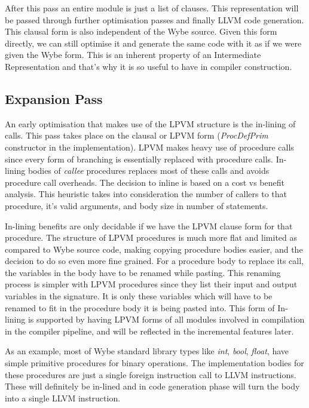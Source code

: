 After this pass an entire module is just a list of clauses. This representation
will be passed through further optimisation passes and finally LLVM code
generation. This clausal form is also independent of the Wybe source. Given
this form directly, we can still optimise it and generate the same code with it
as if we were given the Wybe form. This is an inherent property of an
Intermediate Representation and that's why it is so useful to have in compiler
construction.


\subsection{Expansion Pass}

An early optimisation that makes use of the LPVM structure is the in-lining of
calls. This pass takes place on the clausal or LPVM form (\textit{ProcDefPrim}
constructor in the implementation). LPVM makes heavy use of procedure calls
since every form of branching is essentially replaced with procedure
calls. In-lining bodies of \textit{callee} procedures replaces most of these
calls and avoids procedure call overheads. The decision to inline is based on a
cost vs benefit analysis. This heuristic takes into consideration the number of
callers to that procedure, it's valid arguments, and body size in number of
statements.

In-lining benefits are only decidable if we have the LPVM clause form for that
procedure. The structure of LPVM procedures is much more flat and limited as
compared to Wybe source code, making copying procedure bodies easier, and the
decision to do so even more fine grained. For a procedure body to replace its
call, the variables in the body have to be renamed while pasting. This renaming
process is simpler with LPVM procedures since they list their input and output
variables in the signature. It is only these variables which will have to be
renamed to fit in the procedure body it is being pasted into. This form of
In-lining is supported by having LPVM forms of all modules involved in
compilation in the compiler pipeline, and will be reflected in the incremental
features later. 

As an example, most of Wybe standard library types like \textit{int},
\textit{bool}, \textit{float}, have simple primitive procedures for binary
operations. The implementation bodies for these procedures are just a single
foreign instruction call to LLVM instructions. These will definitely be
in-lined and in code generation phase will turn the body into a single LLVM
instruction.




